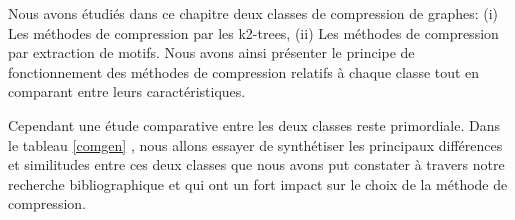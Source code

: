 
Nous avons étudiés dans ce chapitre deux classes de compression de graphes: (i)  Les méthodes de compression par les k2-trees, (ii) Les méthodes de compression par extraction de motifs.
Nous avons ainsi présenter le principe de fonctionnement des méthodes de compression relatifs à chaque classe tout en comparant entre leurs caractéristiques. 

Cependant une étude comparative entre les deux classes reste primordiale. Dans le tableau \ref{comgen} , nous allons essayer de synthétiser les principaux différences et similitudes entre ces deux classes que nous avons put constater à travers notre recherche bibliographique et qui ont un fort impact sur le choix de la méthode de compression.

